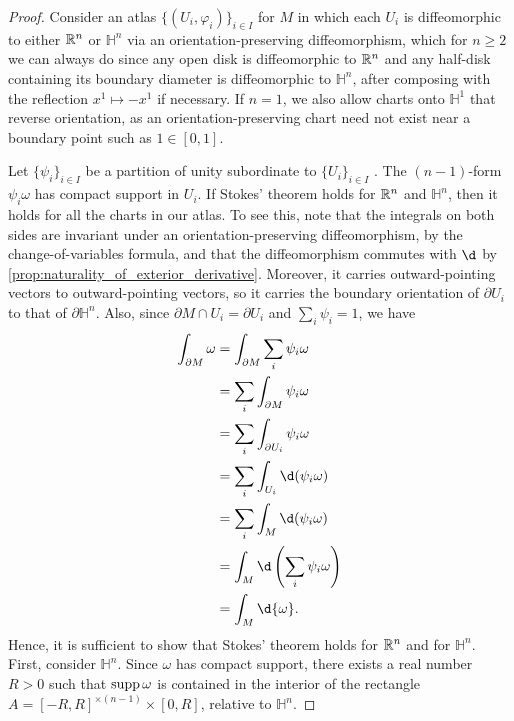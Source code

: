\documentclass[a4paper,12pt]{article}
\begin{document}
\begin{proof}
    Consider an atlas $\{(U_i, \varphi_i)\}_{i \in I}$ for $M$ in which each $U_i$ is diffeomorphic to either $\mathbb{R}^n$ or $\mathbb{H}^n$ via an orientation-preserving diffeomorphism, which for $n \geq 2$ we can always do since any open disk is diffeomorphic to $\mathbb{R}^n$ and any half-disk containing its boundary diameter is diffeomorphic to $\mathbb{H}^n$, after composing with the reflection $x^1 \mapsto -x^1$ if necessary.
    If $n = 1$, we also allow charts onto $\mathbb{H}^1$ that reverse orientation, as an orientation-preserving chart need not exist near a boundary point such as $1 \in [0, 1]$.
    
    Let $\{\psi_i\}_{i \in I}$ be a partition of unity subordinate to $\{U_i\}_{i \in I}$ \cite[Thm.~2.23]{Lee2012}.
    The $(n-1)$-form $\psi_i \omega$ has compact support in $U_i$.
    If Stokes' theorem holds for $\mathbb{R}^n$ and $\mathbb{H}^n$, then it holds for all the charts in our atlas.
    To see this, note that the integrals on both sides are invariant under an orientation-preserving diffeomorphism, by the change-of-variables formula, and that the diffeomorphism commutes with $\d$ by \cref{prop:naturality_of_exterior_derivative}.
    Moreover, it carries outward-pointing vectors to outward-pointing vectors, so it carries the boundary orientation of $\partial U_i$ to that of $\partial \mathbb{H}^n$.
    Also, since $\partial M \cap U_i = \partial U_i$ and $\sum_i \psi_i = 1$, we have
    \begin{align}
        \begin{split}
            \int_{\partial M} \omega &= \int_{\partial M} \sum_i \psi_i \omega \\
        &= \sum_i \int_{\partial M} \psi_i \omega \\
        &= \sum_i \int_{\partial U_i} \psi_i \omega \\
        &= \sum_i \int_{U_i} \d(\psi_i \omega) \\
        &= \sum_i \int_M \d(\psi_i \omega) \\
        &= \int_M \d \left( \sum_i \psi_i \omega \right) \\
        &= \int_M \d{\omega}.
        \end{split}
    \end{align}
    Hence, it is sufficient to show that Stokes' theorem holds for $\mathbb{R}^n$ and for $\mathbb{H}^n$.
    First, consider $\mathbb{H}^n$.
    Since $\omega$ has compact support, there exists a real number $R > 0$ such that $\operatorname{supp} \omega$ is contained in the interior of the rectangle $A = [-R, R]^{\times (n-1)} \times [0, R]$, relative to $\mathbb{H}^n$.

\end{proof}
\end{document}
